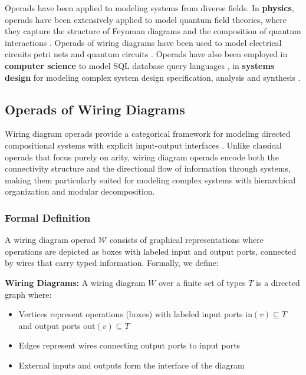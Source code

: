 Operads have been applied to modeling systems from diverse fields. In \textbf{physics}, operads have been extensively applied to model quantum field theories, where they capture the structure of Feynman diagrams and the composition of quantum interactions \cite{baez1997higher}. Operads of wiring diagrams have been used to model electrical circuits petri nets and quantum circuits \cite{spivak2013categorical, baez2020network}. Operads have also been employed in \textbf{computer science} to model SQL database query languages \cite{spivak2013categorical}, in \textbf{systems design} for modeling complex system design specification, analysis and synthesis \cite{Operads for complex system design specification, analysis and synthesis
John D. Foley
, Spencer Breiner
, Eswaran Subrahmanian
and John M. Dusel}.

\subsection{Operads of Wiring Diagrams}

Wiring diagram operads provide a categorical framework for modeling directed compositional systems with explicit input-output interfaces \cite{spivak2013categorical,behr2021operad}. Unlike classical operads that focus purely on arity, wiring diagram operads encode both the connectivity structure and the directional flow of information through systems, making them particularly suited for modeling complex systems with hierarchical organization and modular decomposition.

\subsubsection{Formal Definition}

A wiring diagram operad $\mathcal{W}$ consists of graphical representations where operations are depicted as boxes with labeled input and output ports, connected by wires that carry typed information. Formally, we define:

\textbf{Wiring Diagrams:} A wiring diagram $W$ over a finite set of types $T$ is a directed graph where:
\begin{itemize}
    \item Vertices represent operations (boxes) with labeled input ports $\text{in}(v) \subseteq T$ and output ports $\text{out}(v) \subseteq T$
    \item Edges represent wires connecting output ports to input ports
    \item External inputs and outputs form the interface of the diagram
\end{itemize}

